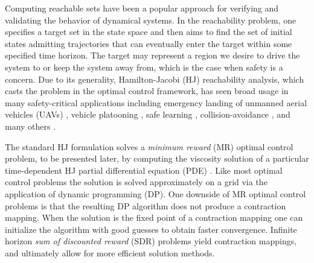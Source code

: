 
Computing reachable sets have been a popular approach for verifying and validating the behavior of dynamical systems. In the reachability problem, one specifies a target set in the state space and then aims to find the set of initial states admitting trajectories that can eventually enter the target within some specified time horizon. The target may represent a region we desire to drive the system to or keep the system away from, which is the case when safety is a concern. Due to its generality, Hamilton-Jacobi (HJ) reachability analysis, which casts the problem in the optimal control framework, has seen broad usage in many safety-critical applications including emergency landing of unmanned aerial vehicles (UAVs) \cite{Ding2016}, vehicle platooning \cite{Chen2015a}, safe learning \cite{Akametalu2014, Gillula2012}, collision-avoidance \cite{Hoffmann2008, Mitchell2005}, and many others \cite{Ding2011a, Huang2011}.

The standard HJ formulation solves a \emph{minimum reward} (MR) optimal control problem, to be presented later, by computing the viscosity solution of a particular time-dependent HJ partial differential equation (PDE) \cite{Mitchell2005}. Like most optimal control problems the solution is solved approximately on a grid via the application of dynamic programming (DP). One downside of MR optimal control problems is that the resulting DP algorithm does not produce a contraction mapping. When the solution is the fixed point of a contraction mapping one can initialize the algorithm with good guesses to obtain faster convergence. Infinite horizon \emph{sum of discounted reward} (SDR) problems yield contraction mappings, and ultimately allow for more efficient solution methods.    

 
